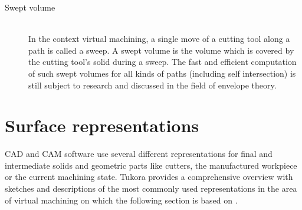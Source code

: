 \begin{description}
	\item[Swept volume] \hfill \\
	In the context virtual machining, a single move of a cutting tool along a path is called a sweep.
	A swept volume is the volume which is covered by the cutting tool's solid during a sweep.
	The fast and efficient computation of such swept volumes for all kinds of paths (including self intersection) is still subject to research and discussed in the field of envelope theory.
	
\end{description}

\section{Surface representations}
\label{sec:surface_representations}

CAD and CAM software use several different representations for final and intermediate solids and geometric parts like cutters, the manufactured workpiece or the current machining state.
Tukora provides a comprehensive overview with sketches and descriptions of the most commonly used representations in the area of virtual machining on which the following section is based on \cite{virtual_machining_review}. 

